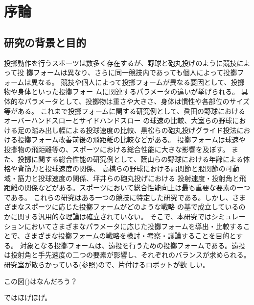 \chapter[序論]%
        {序論}



        \section{研究の背景と目的}

        投擲動作を行うスポーツは数多く存在するが、野球と砲丸投げのように競技によって投
        擲フォームは異なり、さらに同一競技内であっても個人によって投擲フォームは異なる。
        競技や個人によって投擲フォームが異なる要因として、投擲物や身体といった投擲フォー
        ムに関連するパラメータの違いが挙げられる。
        具体的なパラメータとして、投擲物は重さや大きさ、身体は慣性や各部位のサイズ等がある。
        これまで投擲フォームに関する研究例として、眞田の野球におけるオーバーハンドスローとサイドハンドスロー
        の球速の比較、大室らの野球における足の踏み出し幅による投球速度の比較、黒松らの砲丸投げグライド投法における投擲フォーム改善前後の飛距離の比較などがある。
        投擲フォームは球速や投擲物の飛距離等の、スポーツにおける総合性能に大きな影響を及ぼす。
        また、投擲に関する総合性能の研究例として、蔭山らの野球における年齢による体格や背筋力と投球速度の関係、
        高橋らの野球における肩関節と股関節の可動域・筋力と投球速度の関係、坪井らの砲丸投げにおける
        投射速度・投射角と飛距離の関係などがある。スポーツにおいて総合性能向上は最も重要な要素の一つである。
        これらの研究はある一つの競技に特定した研究である。しかし、さまざまなスポーツに応じた投擲フォームがどのような戦略
        の基で成立しているのかに関する汎用的な理論は確立されていない。
        そこで、本研究ではシミュレーションにおいてさまざまなパラメータに応じた投擲フォームを導出・比較することで、さまざまな投擲フォームの戦略を検討・考察・議論することを目的とする。
        対象となる投擲フォームは、遠投を行うための投擲フォームである。遠投は投射角と手先速度の二つの要素が影響し、それぞれのバランスが求められる。\\
        研究室が散らかっている(参照)ので、片付けるロボットが欲
        しい。

        この図()はなんだろう？

        ではほげほげ。


